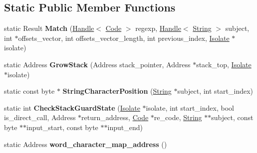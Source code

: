 \subsection*{Static Public Member Functions}
\begin{DoxyCompactItemize}
\item 
static Result {\bfseries Match} (\hyperlink{classv8_1_1internal_1_1_handle}{Handle}$<$ \hyperlink{classv8_1_1internal_1_1_code}{Code} $>$ regexp, \hyperlink{classv8_1_1internal_1_1_handle}{Handle}$<$ \hyperlink{classv8_1_1internal_1_1_string}{String} $>$ subject, int $\ast$offsets\+\_\+vector, int offsets\+\_\+vector\+\_\+length, int previous\+\_\+index, \hyperlink{classv8_1_1internal_1_1_isolate}{Isolate} $\ast$isolate)\hypertarget{classv8_1_1internal_1_1_native_reg_exp_macro_assembler_adf3c85eed3ff0ba2abc1f455bca600be}{}\label{classv8_1_1internal_1_1_native_reg_exp_macro_assembler_adf3c85eed3ff0ba2abc1f455bca600be}

\item 
static Address {\bfseries Grow\+Stack} (Address stack\+\_\+pointer, Address $\ast$stack\+\_\+top, \hyperlink{classv8_1_1internal_1_1_isolate}{Isolate} $\ast$isolate)\hypertarget{classv8_1_1internal_1_1_native_reg_exp_macro_assembler_a473d8e744726a35090f726c48927985c}{}\label{classv8_1_1internal_1_1_native_reg_exp_macro_assembler_a473d8e744726a35090f726c48927985c}

\item 
static const byte $\ast$ {\bfseries String\+Character\+Position} (\hyperlink{classv8_1_1internal_1_1_string}{String} $\ast$subject, int start\+\_\+index)\hypertarget{classv8_1_1internal_1_1_native_reg_exp_macro_assembler_aee21c9c8a14dc0a4cae37b824b37b398}{}\label{classv8_1_1internal_1_1_native_reg_exp_macro_assembler_aee21c9c8a14dc0a4cae37b824b37b398}

\item 
static int {\bfseries Check\+Stack\+Guard\+State} (\hyperlink{classv8_1_1internal_1_1_isolate}{Isolate} $\ast$isolate, int start\+\_\+index, bool is\+\_\+direct\+\_\+call, Address $\ast$return\+\_\+address, \hyperlink{classv8_1_1internal_1_1_code}{Code} $\ast$re\+\_\+code, \hyperlink{classv8_1_1internal_1_1_string}{String} $\ast$$\ast$subject, const byte $\ast$$\ast$input\+\_\+start, const byte $\ast$$\ast$input\+\_\+end)\hypertarget{classv8_1_1internal_1_1_native_reg_exp_macro_assembler_a08cdbd6b3059e962100683a3064adc17}{}\label{classv8_1_1internal_1_1_native_reg_exp_macro_assembler_a08cdbd6b3059e962100683a3064adc17}

\item 
static Address {\bfseries word\+\_\+character\+\_\+map\+\_\+address} ()\hypertarget{classv8_1_1internal_1_1_native_reg_exp_macro_assembler_accf544c18ba07a35b990d2a71412a752}{}\label{classv8_1_1internal_1_1_native_reg_exp_macro_assembler_accf544c18ba07a35b990d2a71412a752}


\end{DoxyCompactItemize}
